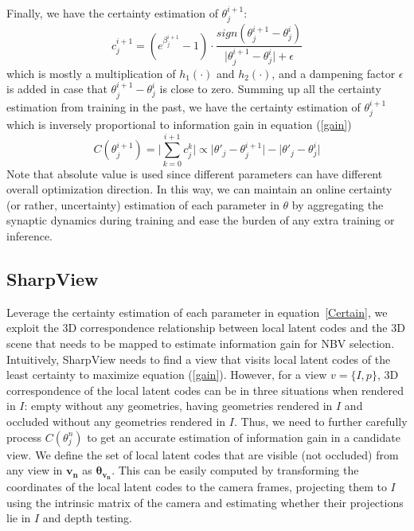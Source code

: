 Finally, we have the certainty estimation of $\theta_j^{i+1}$:
\begin{equation}
    c_j^{i+1}=(e^{\beta_j^{i+1}} - 1) \cdot \frac{sign(\theta_j^{i+1} - \theta_j^{i})}{\lvert \theta_j^{i+1} - \theta_j^{i} \rvert + \epsilon}
    \label{certain}
\end{equation}
which is mostly a multiplication of $h_1(\cdot)$ and $h_2(\cdot)$, and a dampening factor $\epsilon$ is added in case that $\theta_j^{i+1} - \theta_j^{i}$ is close to zero.
Summing up all the certainty estimation from training in the past, we have the certainty estimation of $\theta_j^{i+1}$ which is inversely proportional to information gain in equation (\ref*{gain})
\begin{equation}
    C(\theta_j^{i+1})=\lvert\sum_{k=0}^{i+1} c_j^k\rvert \propto \lvert\theta'_j - \theta_j^{i+1}\rvert - \lvert \theta'_j - \theta_j^{i}\rvert
    \label{Certain}
\end{equation}
Note that absolute value is used since different parameters can have different overall optimization direction.
In this way, we can maintain an online certainty (or rather, uncertainty) estimation of each parameter in $\theta$ by aggregating the synaptic dynamics during training and ease the burden of any extra training or inference.

\subsection{SharpView}
Leverage the certainty estimation of each parameter in equation~\ref{Certain}, we exploit the 3D correspondence relationship between local latent codes and the 3D scene that needs to be mapped to estimate information gain for NBV selection.
Intuitively, SharpView needs to find a view that visits local latent codes of the least certainty to maximize equation (\ref*{gain}).
However, for a view $v=\{I,p\}$, 3D correspondence of the local latent codes can be in three situations when rendered in $I$: empty without any geometries, having geometries rendered in $I$ and occluded without any geometries rendered in $I$.
Thus, we need to further carefully process $C(\theta_j^{n})$ to get an accurate estimation of information gain in a candidate view.
We define the set of local latent codes that are visible (not occluded) from any view in $\bm{v_n}$ as $\bm{\theta_{v_n}}$.
This can be easily computed by transforming the coordinates of the local latent codes to the camera frames, projecting them to $I$ using the intrinsic matrix of the camera and estimating whether their projections lie in $I$ and depth testing.

